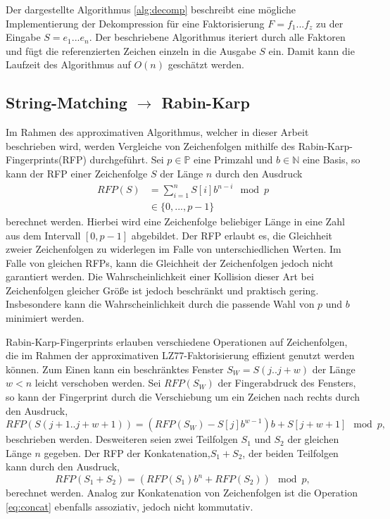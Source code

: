 Der dargestellte Algorithmus \ref{alg:decomp} beschreibt eine mögliche Implementierung der Dekompression für eine Faktorisierung $F=f_1...f_z$ zu der Eingabe $S=e_1...e_n$.
Der beschriebene Algorithmus iteriert durch alle Faktoren und fügt die referenzierten Zeichen einzeln in die Ausgabe $S$ ein. Damit kann die Laufzeit des Algorithmus auf $O(n)$
geschätzt werden.

\subsection{String-Matching $\rightarrow$ Rabin-Karp}
Im Rahmen des approximativen Algorithmus, welcher in dieser Arbeit beschrieben wird, werden Vergleiche von Zeichenfolgen mithilfe des Rabin-Karp-Fingerprints(RFP)\cite{ApproxLZ77}
durchgeführt. Sei
$p\in \mathbb{P}$ eine Primzahl und $b\in \mathbb{N}$ eine Basis, so kann der RFP einer Zeichenfolge $S$ der Länge $n$ durch den Ausdruck
\begin{equation}
    \begin{split}
    RFP(S) &= \sum_{i=1}^{n} S[i]b^{n-i} \mod p \\
    &\in \{0,...,p-1\}
    \end{split}
\end{equation}
berechnet werden. Hierbei wird eine Zeichenfolge beliebiger Länge in eine Zahl aus dem Intervall $[0,p-1]$ abgebildet. Der RFP erlaubt es, die Gleichheit zweier Zeichenfolgen zu widerlegen
im Falle von unterschiedlichen Werten. Im Falle von gleichen RFPs, kann die Gleichheit der Zeichenfolgen jedoch nicht garantiert werden. Die Wahrscheinlichkeit einer Kollision 
dieser Art bei Zeichenfolgen gleicher Größe ist jedoch beschränkt und praktisch gering\cite{ApproxLZ77}. Insbesondere kann die Wahrscheinlichkeit durch die passende Wahl von $p$ und $b$ 
minimiert werden.

Rabin-Karp-Fingerprints erlauben verschiedene Operationen auf Zeichenfolgen, die im Rahmen der approximativen LZ77-Faktorisierung effizient genutzt werden können. Zum Einen kann ein
beschränktes Fenster $S_{W} = S(j..j+w)$ der Länge $w<n$ leicht verschoben werden. Sei $RFP(S_{W})$ der Fingerabdruck des Fensters, so kann der Fingerprint durch die Verschiebung um 
ein Zeichen nach rechts durch den Ausdruck,
\begin{equation} \label{eq:shift}
    RFP(S(j+1..j+w+1)) = (RFP(S_W) - S[j]b^{w-1})b + S[j+w+1] \mod p,
\end{equation}
beschrieben werden. Desweiteren seien zwei Teilfolgen $S_1$ und $S_2$ der gleichen Länge $n$ gegeben. Der RFP der Konkatenation,$S_1+S_2$, der beiden Teilfolgen kann durch den Ausdruck,
\begin{equation} \label{eq:concat}
    RFP(S_1 + S_2) = (RFP(S_1)b^n + RFP(S_2)) \mod p,
\end{equation}
berechnet werden. Analog zur Konkatenation von Zeichenfolgen ist die Operation \ref{eq:concat} ebenfalls assoziativ, jedoch nicht kommutativ.

